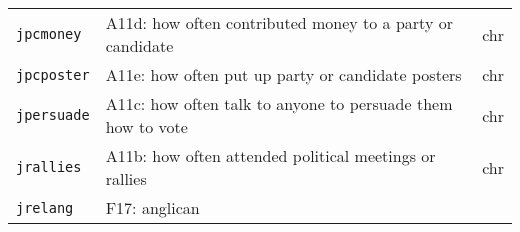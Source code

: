 \documentclass[]{article}
\begin{document}
\begin{longtable}[]{@{}lll@{}}
\begin{minipage}[t]{0.14\columnwidth}\raggedright\strut
\texttt{jpcmoney}\strut
\end{minipage} & \begin{minipage}[t]{0.70\columnwidth}\raggedright\strut
A11d: how often contributed money to a party or candidate\strut
\end{minipage} & \begin{minipage}[t]{0.08\columnwidth}\raggedright\strut
chr\strut
\end{minipage}\tabularnewline
\begin{minipage}[t]{0.14\columnwidth}\raggedright\strut
\texttt{jpcposter}\strut
\end{minipage} & \begin{minipage}[t]{0.70\columnwidth}\raggedright\strut
A11e: how often put up party or candidate posters\strut
\end{minipage} & \begin{minipage}[t]{0.08\columnwidth}\raggedright\strut
chr\strut
\end{minipage}\tabularnewline
\begin{minipage}[t]{0.14\columnwidth}\raggedright\strut
\texttt{jpersuade}\strut
\end{minipage} & \begin{minipage}[t]{0.70\columnwidth}\raggedright\strut
A11c: how often talk to anyone to persuade them how to vote\strut
\end{minipage} & \begin{minipage}[t]{0.08\columnwidth}\raggedright\strut
chr\strut
\end{minipage}\tabularnewline
\begin{minipage}[t]{0.14\columnwidth}\raggedright\strut
\texttt{jrallies}\strut
\end{minipage} & \begin{minipage}[t]{0.70\columnwidth}\raggedright\strut
A11b: how often attended political meetings or rallies\strut
\end{minipage} & \begin{minipage}[t]{0.08\columnwidth}\raggedright\strut
chr\strut
\end{minipage}\tabularnewline
\begin{minipage}[t]{0.14\columnwidth}\raggedright\strut
\texttt{jrelang}\strut
\end{minipage} & \begin{minipage}[t]{0.70\columnwidth}\raggedright\strut
F17: anglican\strut
\end{minipage} & \begin{minipage}[t]{0.08\columnwidth}\raggedright\strut

\end{minipage}
\end{longtable}
\end{document}
